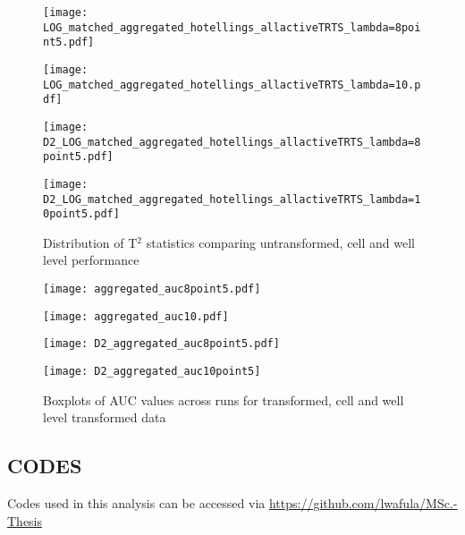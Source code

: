 \documentclass[11pt]{article}
\begin{document}

\clearpage
\begin{figure}[ht!]
\begin{minipage}{.495\textwidth}
\centering
\texttt{[image: LOG\_matched\_aggregated\_hotellings\_allactiveTRTS\_lambda=8point5.pdf]}
\end{minipage}
\begin{minipage}{.495\textwidth}
\centering
\texttt{[image: LOG\_matched\_aggregated\_hotellings\_allactiveTRTS\_lambda=10.pdf]}
\end{minipage}

\begin{minipage}{.495\textwidth}
\centering
\texttt{[image: D2\_LOG\_matched\_aggregated\_hotellings\_allactiveTRTS\_lambda=8point5.pdf]}
\end{minipage}
\begin{minipage}{.495\textwidth}
\centering
\texttt{[image: D2\_LOG\_matched\_aggregated\_hotellings\_allactiveTRTS\_lambda=10point5.pdf]}
\end{minipage}
\caption{Distribution of T$^2$ statistics comparing untransformed, cell and well level performance}
\label{distt10501_agg_poor}
\end{figure}

\clearpage
\begin{figure}[ht!] %
\centering
\begin{minipage}{.495\textwidth}
\centering
\texttt{[image: aggregated\_auc8point5.pdf]}
\end{minipage}
\begin{minipage}{.495\textwidth}
\centering
\texttt{[image: aggregated\_auc10.pdf]}
\end{minipage}

\begin{minipage}{.495\textwidth}
\centering
\texttt{[image: D2\_aggregated\_auc8point5.pdf]}
\end{minipage}
\begin{minipage}{.495\textwidth}
\centering
\texttt{[image: D2\_aggregated\_auc10point5]}
\end{minipage}
\caption{Boxplots of AUC values across runs for transformed, cell and well level transformed data}
\label{agg_allbox_poor}
\end{figure}

\subsection*{CODES}
Codes used in this analysis can be accessed via \url{https://github.com/lwafula/MSc.-Thesis}
\end{document}
